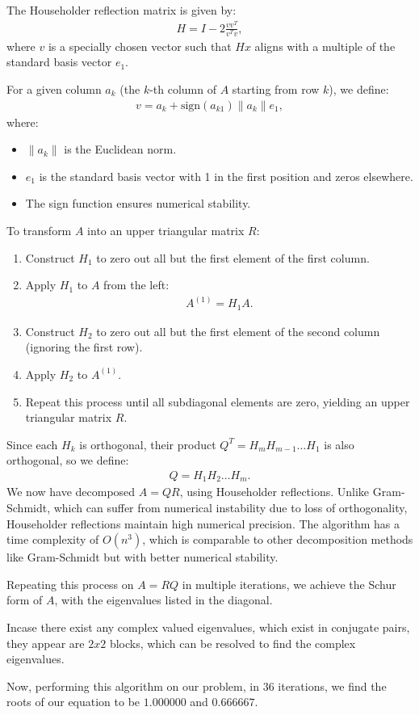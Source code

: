 \documentclass[journal]{IEEEtran}
\begin{document}
The Householder reflection matrix is given by:
\begin{align}
    H = I - 2 \frac{vv^T}{v^T v},
\end{align}
where $v$ is a specially chosen vector such that $Hx$ aligns with a multiple of the standard basis vector $e_1$.

For a given column $a_k$ (the $k$-th column of $A$ starting from row $k$), we define:
\begin{align}
    v = a_k + \text{sign}(a_{k1}) \|a_k\| e_1,
\end{align}
where:
\begin{itemize}
    \item $\|a_k\|$ is the Euclidean norm.
    \item $e_1$ is the standard basis vector with 1 in the first position and zeros elsewhere.
    \item The sign function ensures numerical stability.
\end{itemize}
To transform $A$ into an upper triangular matrix $R$:
\begin{enumerate}
    \item Construct $H_1$ to zero out all but the first element of the first column.
    \item Apply $H_1$ to $A$ from the left:
    \begin{align}
        A^{(1)} = H_1 A.
    \end{align}
    \item Construct $H_2$ to zero out all but the first element of the second column (ignoring the first row).
    \item Apply $H_2$ to $A^{(1)}$.
    \item Repeat this process until all subdiagonal elements are zero, yielding an upper triangular matrix $R$.
\end{enumerate}

Since each $H_k$ is orthogonal, their product $Q^T = H_m H_{m-1} \dots H_1$ is also orthogonal, so we define:
\begin{align}
    Q = H_1 H_2 \dots H_m.
\end{align}
We now have decomposed $A = QR$, using Householder reflections. Unlike Gram-Schmidt, which can suffer from numerical instability due to loss of orthogonality, Householder reflections maintain high numerical precision. The algorithm has a time complexity of $O(n^3)$, which is comparable to other decomposition methods like Gram-Schmidt but with better numerical stability.  

Repeating this process on $A=RQ$ in multiple iterations, we achieve the Schur form of $A$, with the eigenvalues listed in the diagonal. 

Incase there exist any complex valued eigenvalues, which exist in conjugate pairs, they appear are $2x2$ blocks, which can be resolved to find the complex eigenvalues. 

Now, performing this algorithm on our problem, in $36$ iterations, we find the roots of our equation to be $1.000000$ and $0.666667$. 
\end{document}
